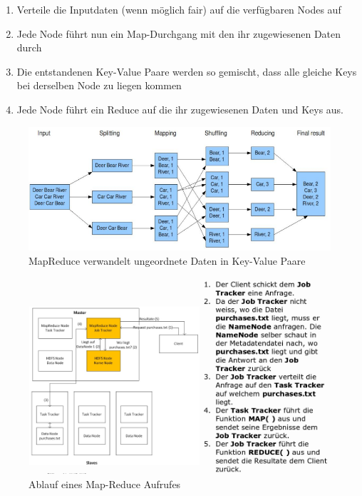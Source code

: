 \documentclass[a4paper, 11pt, nofootinbib]{article}
\begin{document}
\begin{enumerate}
	\item Verteile die Inputdaten (wenn möglich fair) auf die verfügbaren Nodes auf
	\item Jede Node führt nun ein Map-Durchgang mit den ihr zugewiesenen Daten durch
	\item Die entstandenen Key-Value Paare werden so gemischt, dass alle gleiche Keys bei derselben Node zu liegen kommen
	\item Jede Node führt ein Reduce auf die ihr zugewiesenen Daten und Keys aus.
\end{enumerate}

\begin{figure}[htb]
	\centering
	\includegraphics[keepaspectratio=true,height=14\baselineskip]{mapreduce.png}
	\caption{MapReduce verwandelt ungeordnete Daten in Key-Value Paare}
	\label{fig:mapreduce}
\end{figure}

\begin{figure}[htb]
	\centering
	\includegraphics[keepaspectratio=true,height=20\baselineskip]{map_reduce_call.png}
	\caption{Ablauf eines Map-Reduce Aufrufes}
	\label{fig:mapreducecall}
\end{figure}
\end{document}
